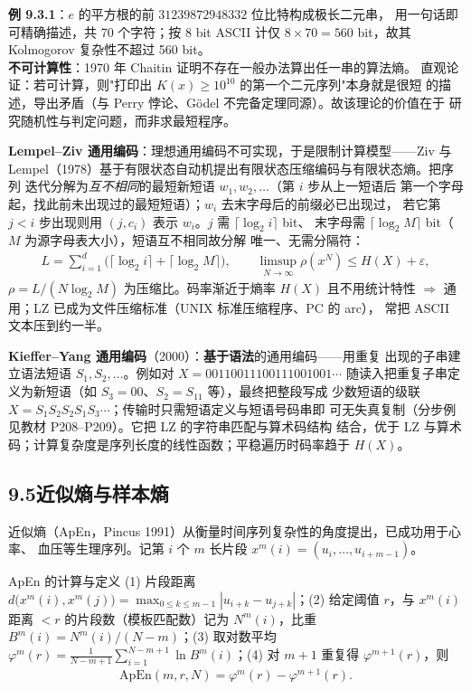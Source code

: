 \textbf{例 9.3.1}：$e$ 的平方根的前 $31239872948332$ 位比特构成极长二元串，
用一句话即可精确描述，共 70 个字符；按 8 bit ASCII 计仅
$8\times70=560$ bit，故其 Kolmogorov 复杂性不超过 560 bit。\\
\textbf{不可计算性}：1970 年 Chaitin 证明不存在一般办法算出任一串的算法熵。
直观论证：若可计算，则"打印出 $K(x)\ge10^{10}$ 的第一个二元序列"本身就是很短
的描述，导出矛盾（与 Perry 悖论、Gödel 不完备定理同源）。故该理论的价值在于
研究随机性与判定问题，而非求最短程序。

\textbf{Lempel--Ziv 通用编码}：理想通用编码不可实现，于是限制计算模型——Ziv
与 Lempel（1978）基于有限状态自动机提出有限状态压缩编码与有限状态熵。把序列
迭代分解为\emph{互不相同}的最短新短语 $w_1,w_2,\dots$（第 $i$ 步从上一短语后
第一个字母起，找此前未出现过的最短短语）；$w_i$ 去末字母后的前缀必已出现过，
若它第 $j<i$ 步出现则用 $(j,c_i)$ 表示 $w_i$。$j$ 需 $\lceil\log_2i\rceil$ bit、
末字母需 $\lceil\log_2M\rceil$ bit（$M$ 为源字母表大小），短语互不相同故分解
唯一、无需分隔符：
\begin{align*}
L=\sum_{i=1}^{d}\bigl(\lceil\log_2i\rceil+\lceil\log_2M\rceil\bigr),
\qquad
\limsup_{N\to\infty}\rho(x^{N})\le H(X)+\varepsilon,
\end{align*}
$\rho=L/(N\log_2M)$ 为压缩比。码率渐近于熵率 $H(X)$ 且不用统计特性
$\Rightarrow$ 通用；LZ 已成为文件压缩标准（UNIX 标准压缩程序、PC 的 arc），
常把 ASCII 文本压到约一半。

\textbf{Kieffer--Yang 通用编码}（2000）：\textbf{基于语法}的通用编码——用重复
出现的子串建立语法短语 $S_1,S_2,\dots$。例如对 $X=00110011100111001001\cdots$
随读入把重复子串定义为新短语（如 $S_3=00$、$S_2=S_11$ 等），最终把整段写成
少数短语的级联 $X=S_1S_2S_2S_1S_3\cdots$；传输时只需短语定义与短语号码串即
可无失真复制（分步例见教材 P208--P209）。它把 LZ 的字符串匹配与算术码结构
结合，优于 LZ 与算术码；计算复杂度是序列长度的线性函数；平稳遍历时码率趋于
$H(X)$。

\subsection{9.5\quad 近似熵与样本熵}

近似熵（ApEn，Pincus 1991）从衡量时间序列复杂性的角度提出，已成功用于心率、
血压等生理序列。记第 $i$ 个 $m$ 长片段 $x^{m}(i)=(u_i,\dots,u_{i+m-1})$。

\begin{defbox}{ApEn 的计算与定义}
(1) 片段距离 $d\bigl(x^{m}(i),x^{m}(j)\bigr)
=\max_{0\le k\le m-1}|u_{i+k}-u_{j+k}|$；(2) 给定阈值 $r$，与 $x^m(i)$ 距离
$<r$ 的片段数（模板匹配数）记为 $N^{m}(i)$，比重
$B^{m}(i)=N^{m}(i)/(N-m)$；(3) 取对数平均
$\varphi^{m}(r)=\frac{1}{N-m+1}\sum_{i=1}^{N-m+1}\ln B^{m}(i)$；(4) 对 $m+1$
重复得 $\varphi^{m+1}(r)$，则
\begin{align*}
\mathrm{ApEn}(m,r,N)=\varphi^{m}(r)-\varphi^{m+1}(r).
\end{align*}
\end{defbox}

